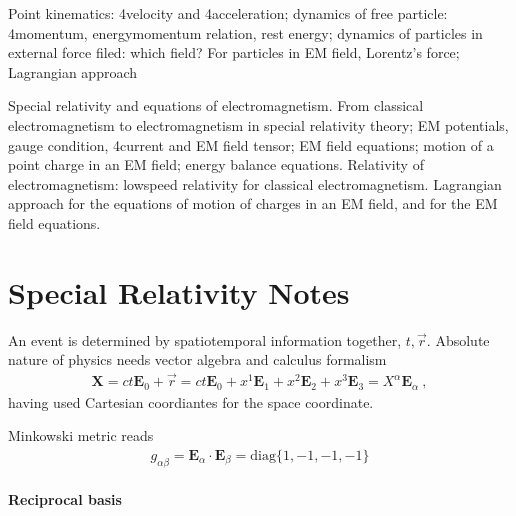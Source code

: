 \documentclass[letterpaper,10pt,english]{jupyterBook}
\begin{document}
\sphinxAtStartPar
{} Point kinematics: 4\sphinxhyphen{}velocity and 4\sphinxhyphen{}acceleration; dynamics of free particle: 4\sphinxhyphen{}momentum, energy\sphinxhyphen{}momentum relation, rest energy; dynamics of particles in external force filed: which field? For particles in EM field, Lorentz’s force; Lagrangian approach

\sphinxAtStartPar
{} Special relativity and equations of electromagnetism. From classical electromagnetism to electromagnetism in special relativity theory; EM potentials, gauge condition, 4\sphinxhyphen{}current and EM field tensor; EM field equations; motion of a point charge in an EM field; energy balance equations. Relativity of electromagnetism: low\sphinxhyphen{}speed relativity for classical electromagnetism. Lagrangian approach for the equations of motion of charges in an EM field, and for the EM field equations.



\sphinxstepscope


\chapter{Special Relativity \sphinxhyphen{} Notes}
\label{\detokenize{ch/relativity-special/notes:special-relativity-notes}}\label{\detokenize{ch/relativity-special/notes:relativity-special-notes}}\label{\detokenize{ch/relativity-special/notes::doc}}
\sphinxAtStartPar
An event is determined by spatio\sphinxhyphen{}temporal information together, \(t, \vec{r}\). Absolute nature of physics needs vector algebra and calculus formalism
\begin{equation*}
\begin{split}\mathbf{X} = c  t  \mathbf{E}_0 + \vec{r} =  c  t  \mathbf{E}_0 + x^1 \mathbf{E}_1 + x^2 \mathbf{E}_2 + x^3 \mathbf{E}_3 = X^{\alpha} \mathbf{E}_{\alpha} \ ,\end{split}
\end{equation*}
\sphinxAtStartPar
having used Cartesian coordiantes for the space coordinate.

\sphinxAtStartPar
{} Minkowski metric reads
\begin{equation*}
\begin{split}g_{\alpha \beta} = \mathbf{E}_{\alpha} \cdot \mathbf{E}_{\beta} = \text{diag}\{1, -1, -1, -1\}\end{split}
\end{equation*}\subsubsection*{Reciprocal basis}
\end{document}
